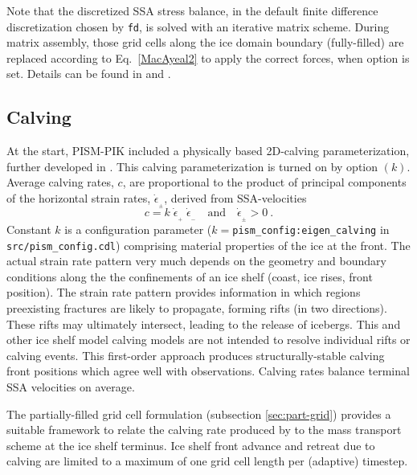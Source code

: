 Note that the discretized SSA stress balance, in the default finite difference discretization chosen by  \texttt{fd}, is solved with an iterative matrix scheme. During matrix assembly, those grid cells along the ice domain boundary (fully-filled) are replaced according to Eq.~\eqref{MacAyeal2} to apply the correct forces, when option  is set.  Details can be found in \cite{Winkelmannetal2011} and \cite{Albrechtetal2011}.  

\subsection{Calving}
\label{sec:calving}
At the start, PISM-PIK included a physically based 2D-calving parameterization, further developed in \cite{LevermannAlbrecht11}. This calving parameterization is turned on by option  $(k)$.  Average calving rates, $c$, are proportional to the product of principal components of the horizontal strain rates, $\dot{\epsilon}_{_\pm}$, derived from SSA-velocities 
\begin{equation}
\label{eq: calv2}
c = k\; \dot{\epsilon}_{_+}\; \dot{\epsilon}_{_-}\quad\text{and}\quad\dot{\epsilon}_{_\pm}>0\:.
\end{equation}
Constant $k$ is a configuration parameter ($k=$\texttt{pism_config:eigen_calving} in \texttt{src/pism_config.cdl}) comprising material properties of the ice at the front. The actual strain rate pattern very much depends on the geometry and boundary conditions along the the confinements of an ice shelf (coast, ice rises, front position).  The strain rate pattern provides information in which regions preexisting fractures are likely to propagate, forming rifts (in two directions).  These rifts may ultimately intersect, leading to the release of icebergs. This and other ice shelf model calving models are not intended to resolve individual rifts or calving events. This first-order approach produces structurally-stable calving front positions which agree well with observations.  Calving rates balance terminal SSA velocities on average.

The partially-filled grid cell formulation (subsection \ref{sec:part-grid}) provides a suitable framework to relate the calving rate produced by  to the mass transport scheme at the ice shelf terminus.  Ice shelf front advance and retreat due to calving are limited to a maximum of one grid cell length per (adaptive) timestep.

